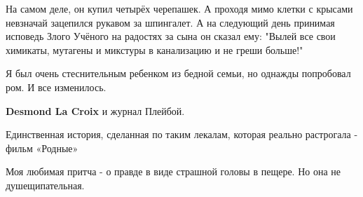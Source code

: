 \begin{itemize}
 

На самом деле, он купил четырёх черепашек. А проходя мимо клетки с крысами
невзначай зацепился рукавом за шпингалет. А на следующий день принимая исповедь
Злого Учёного на радостях за сына он сказал ему: "Вылей все свои химикаты,
мутагены и микстуры в канализацию и не греши больше!"


 

Я был очень стеснительным ребенком из бедной семьи, но однажды попробовал ром.
И все изменилось.

\begin{itemize}
 
\textbf{Desmond La Croix} и журнал Плейбой.
\end{itemize}

 
Единственная история, сделанная по таким лекалам, которая реально растрогала - фильм «Родные»

 
Моя любимая притча - о правде в виде страшной головы в пещере. Но она не душещипательная.

 

\end{itemize}
